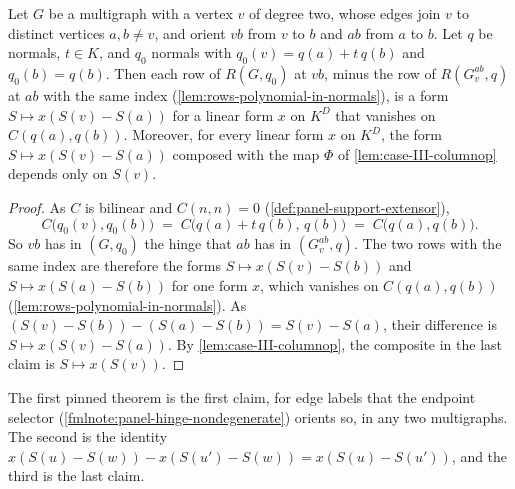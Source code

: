 \begin{lemma}
  \label{lem:case-III-transport-collapse}
  \leanok
  Let $G$ be a multigraph with a vertex $v$ of degree two, whose edges
  join $v$ to distinct vertices $a, b \neq v$, and orient $vb$ from $v$
  to $b$ and $ab$ from $a$ to $b$. Let $q$ be normals, $t \in K$, and
  $q_0$ normals with $q_0(v) = q(a) + t\,q(b)$ and $q_0(b) = q(b)$. Then
  each row of $R(G, q_0)$ at $vb$, minus the row of $R(G_v^{ab}, q)$ at
  $ab$ with the same index (\cref{lem:rows-polynomial-in-normals}), is a
  form $S \mapsto x(S(v) - S(a))$ for a linear form $x$ on $K^D$ that
  vanishes on $C(q(a), q(b))$. Moreover, for every linear form $x$ on
  $K^D$, the form $S \mapsto x(S(v) - S(a))$ composed with the map
  $\Phi$ of \cref{lem:case-III-columnop} depends only on $S(v)$.
\end{lemma}
\begin{proof}
  \leanok
  As $C$ is bilinear and $C(n, n) = 0$
  (\cref{def:panel-support-extensor}),
  \[
    C\bigl(q_0(v), q_0(b)\bigr) \;=\; C\bigl(q(a) + t\,q(b),\, q(b)\bigr)
    \;=\; C\bigl(q(a), q(b)\bigr).
  \]
  So $vb$ has in $(G, q_0)$ the hinge that $ab$ has in $(G_v^{ab}, q)$.
  The two rows with the same index are therefore the forms
  $S \mapsto x(S(v) - S(b))$ and $S \mapsto x(S(a) - S(b))$ for one form
  $x$, which vanishes on $C(q(a), q(b))$
  (\cref{lem:rows-polynomial-in-normals}). As
  $(S(v) - S(b)) - (S(a) - S(b)) = S(v) - S(a)$, their difference is
  $S \mapsto x(S(v) - S(a))$. By \cref{lem:case-III-columnop}, the
  composite in the last claim is $S \mapsto x(S(v))$.
\end{proof}

\begin{fmlnote}
  The first pinned theorem is the first claim, for edge labels that the
  endpoint selector (\cref{fmlnote:panel-hinge-nondegenerate}) orients
  so, in any two multigraphs. The second is the identity
  $x(S(u) - S(w)) - x(S(u') - S(w)) = x(S(u) - S(u'))$, and the third is
  the last claim.
\end{fmlnote}


